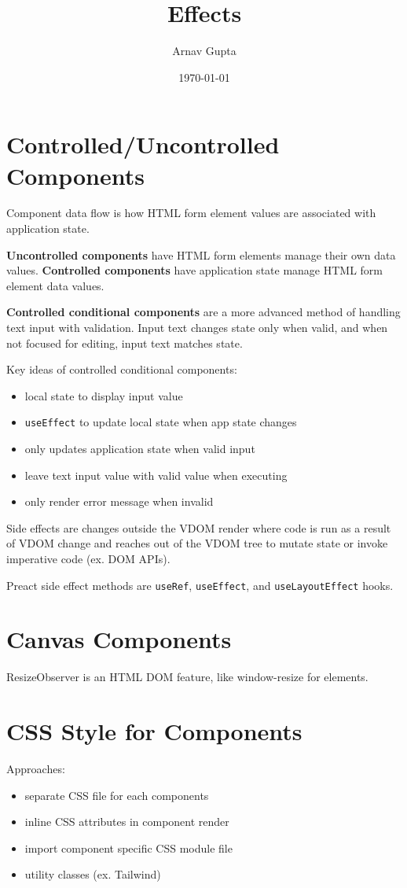 \documentclass[11pt]{article}
\author{Arnav Gupta}
\date{\today}
\title{Effects}
\begin{document}
\maketitle
\tableofcontents

\section{Controlled/Uncontrolled Components}
\label{sec:orga742dec}
Component data flow is how HTML form element values are associated with application state.

\textbf{Uncontrolled components} have HTML form elements manage their own data values.
\textbf{Controlled components} have application state manage HTML form element data values.

\textbf{Controlled conditional components} are a more advanced method of handling text input with
validation.
Input text changes state only when valid, and when not focused for editing, input text
matches state.

Key ideas of controlled conditional components:
\begin{itemize}
\item local state to display input value
\item \texttt{useEffect} to update local state when app state changes
\item only updates application state when valid input
\item leave text input value with valid value when executing
\item only render error message when invalid
\end{itemize}

Side effects are changes outside the VDOM render where code is run as a result of VDOM
change and reaches out of the VDOM tree to mutate state or invoke imperative code (ex.
DOM APIs).

Preact side effect methods are \texttt{useRef}, \texttt{useEffect}, and \texttt{useLayoutEffect} hooks.
\section{Canvas Components}
\label{sec:org4957e30}
ResizeObserver is an HTML DOM feature, like window-resize for elements.
\section{CSS Style for Components}
\label{sec:org8f6e6f7}
Approaches:
\begin{itemize}
\item separate CSS file for each components
\item inline CSS attributes in component render
\item import component specific CSS module file
\item utility classes (ex. Tailwind)
\end{itemize}
\end{document}

